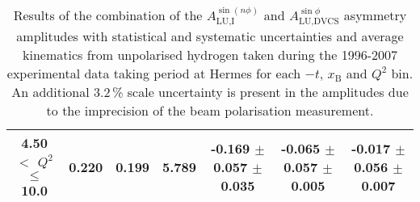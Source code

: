\begin{table}[width=15cm]
\begin{center}
{\begin{tabular}{|c|c|c|c|c|c|c|}
4.50 $<$ $Q^{2}$ $\leqslant$ 10.0 &  0.220 & 0.199 &  5.789  &  -0.169 $\pm$ 0.057  $\pm$   0.035 &
-0.065  $\pm$  0.057 $\pm$ 0.005 & -0.017  $\pm$  0.056  $\pm$  0.007\\
\hline
  \end{tabular}
}
 \end{center}
\caption{Results of the combination of the $A_{\textrm{LU,I}}^{\sin(n\phi)}$ and $A_{\textrm{LU,DVCS}}^{\sin \phi}$ asymmetry amplitudes with statistical and systematic uncertainties and average kinematics from unpolarised hydrogen taken during
the 1996-2007 experimental data taking period at H{\sc ermes} for each $-t$, $x_{\textrm{B}}$ and $Q^{2}$ bin.
An additional 3.2\,\% scale uncertainty is present in the amplitudes due to the imprecision of
the beam polarisation measurement.
}
\end{table}


